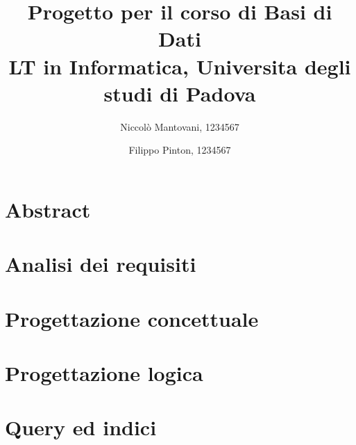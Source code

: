 \documentclass[a4paper,10pt]{article}
\begin{document}
\title{%
    Progetto per il corso di Basi di Dati \\
    \large LT in Informatica, Universita degli studi di Padova}
\author{Niccolò Mantovani, 1234567
    \and
    Filippo Pinton, 1234567}
\date{}

\maketitle

\tableofcontents

\section{Abstract}


\section{Analisi dei requisiti}


\section{Progettazione concettuale}


\section{Progettazione logica}


\section{Query ed indici}

\end{document}
